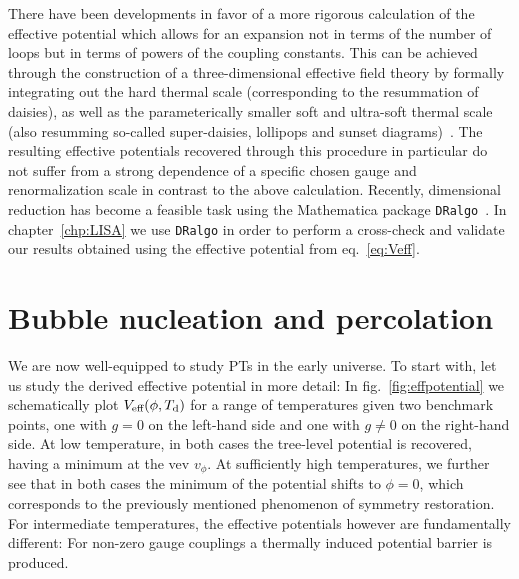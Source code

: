 There have been developments in favor of a more rigorous calculation of the effective potential which allows for an expansion not in terms of the number of loops but in terms of powers of the coupling constants. This can be achieved through the construction of a three-dimensional effective field theory by formally integrating out the hard thermal scale (corresponding to the resummation of daisies), as well as the parameterically smaller soft and ultra-soft thermal scale (also resumming so-called super-daisies, lollipops and sunset diagrams)~\cite{Laine:2016hma,Curtin:2016urg}. The resulting  effective potentials recovered through this procedure in particular do not suffer from a strong dependence of a specific chosen gauge and renormalization scale in contrast to the above calculation. Recently, dimensional reduction has become a feasible task using the Mathematica package \texttt{DRalgo}~\cite{Ekstedt:2022bff}. In chapter~\ref{chp:LISA} we use \texttt{DRalgo} in order to perform a cross-check and validate our results obtained using the effective potential from eq.~\eqref{eq:Veff}.


\section{Bubble nucleation and percolation}
\label{sec:fopts}

We are now well-equipped to study \acp{PT} in the early universe. To start with, let us study the derived effective potential in more detail: In fig.~\ref{fig:effpotential} we schematically plot $V_{\text{eff}}(\phi, T_\text{d})$ for a range of temperatures given two benchmark points, one with $g = 0$ on the left-hand side and one with $g \neq 0$ on the right-hand side. At low temperature, in both cases the tree-level potential is recovered, having a minimum at the \ac{vev} $v_\phi$. At  sufficiently high temperatures, we further see that in both cases the minimum of the potential shifts to $\phi = 0$, which corresponds to the previously mentioned phenomenon of symmetry restoration. For intermediate temperatures, the effective potentials however are fundamentally different: For non-zero gauge couplings a thermally induced potential barrier is produced. 

